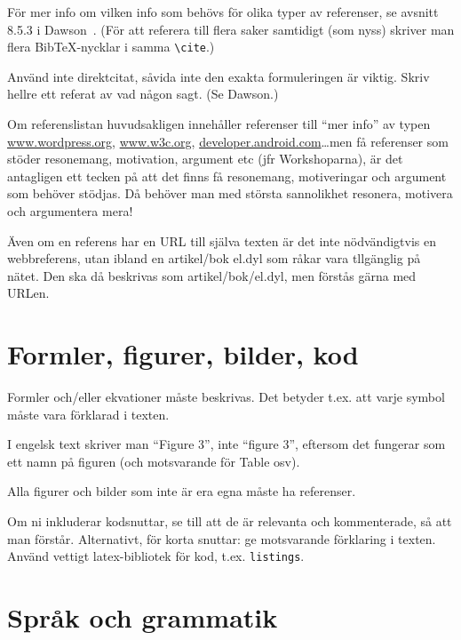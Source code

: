 \documentclass[a4paper,12pt]{article}
\begin{document}
För mer info om vilken info som behövs för olika typer av referenser, se avsnitt 8.5.3 i Dawson~\cite{dawson:projects-in-computing,dawson:projects-in-computing-old}. (För att referera till flera saker samtidigt (som nyss) skriver man flera BibTeX-nycklar i samma \verb|\cite|.)

Använd inte direktcitat, såvida inte den exakta formuleringen är viktig.  Skriv hellre ett referat av vad någon sagt. (Se Dawson.)

Om referenslistan huvudsakligen innehåller referenser till ``mer info'' av typen
\url{www.wordpress.org}, \url{www.w3c.org}, \url{developer.android.com}\ldots men få referenser som stöder resonemang, motivation, argument etc (jfr Workshoparna), är det antagligen ett tecken på att det finns få resonemang, motiveringar och argument som behöver stödjas. Då behöver man med största sannolikhet resonera, motivera och argumentera mera!

Även om en referens har en URL till själva texten är det inte nödvändigtvis en webbreferens, utan ibland en artikel/bok el.dyl som råkar vara tllgänglig på nätet. Den ska då beskrivas som artikel/bok/el.dyl, men förstås gärna med URLen.

\section{Formler, figurer, bilder, kod}
\label{sec:forml-figur-bild}

Formler och/eller ekvationer måste beskrivas.  Det betyder t.ex. att varje symbol måste vara förklarad i texten.

I engelsk text skriver man ``Figure 3'', inte ``figure 3'', eftersom det fungerar som ett namn på figuren (och motsvarande för Table osv).

Alla figurer och bilder som inte är era egna måste ha referenser.

Om ni inkluderar kodsnuttar, se till att de är relevanta och kommenterade, så att man förstår.  Alternativt, för korta snuttar: ge motsvarande förklaring i texten.
Använd vettigt latex-bibliotek för kod, t.ex. \texttt{listings}.

\section{Språk och grammatik}
\label{sec:sprak-och-grammatik}
\end{document}
